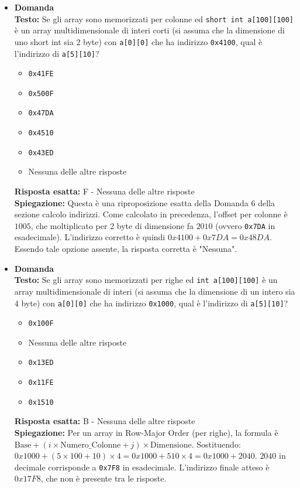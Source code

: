 \documentclass[12pt, a4paper]{article}
\newcounter{domandateoria}
\begin{document}
\begin{itemize}
\newpage

    \item {}\textbf{Domanda \thedomandateoria} \\
    \textbf{Testo:} Se gli array sono memorizzati per colonne ed \texttt{short int a[100][100]} è un array multidimensionale di interi corti (si assuma che la dimensione di uno short int sia 2 byte) con \texttt{a[0][0]} che ha indirizzo \texttt{0x4100}, qual è l'indirizzo di \texttt{a[5][10]}?
    \begin{itemize}
        \item[A)] \texttt{0x41FE}
        \item[B)] \texttt{0x500F}
        \item[C)] \texttt{0x47DA}
        \item[D)] \texttt{0x4510}
        \item[E)] \texttt{0x43ED}
        \item[F)] Nessuna delle altre risposte
    \end{itemize}
    \textbf{Risposta esatta:} F - Nessuna delle altre risposte \\
    \textbf{Spiegazione:} Questa è una riproposizione esatta della Domanda 6 della sezione calcolo indirizzi. Come calcolato in precedenza, l'offset per colonne è $1005$, che moltiplicato per 2 byte di dimensione fa $2010$ (ovvero \texttt{0x7DA} in esadecimale). L'indirizzo corretto è quindi $0x4100 + 0x7DA = 0x48DA$. Essendo tale opzione assente, la risposta corretta è "Nessuna".
    \vspace{0.3cm}

    \item {}\textbf{Domanda \thedomandateoria} \\
    \textbf{Testo:} Se gli array sono memorizzati per righe ed \texttt{int a[100][100]} è un array multidimensionale di interi (si assuma che la dimensione di un intero sia 4 byte) con \texttt{a[0][0]} che ha indirizzo \texttt{0x1000}, qual è l'indirizzo di \texttt{a[5][10]}?
    \begin{itemize}
        \item[A)] \texttt{0x100F}
        \item[B)] Nessuna delle altre risposte
        \item[C)] \texttt{0x13ED}
        \item[D)] \texttt{0x11FE}
        \item[E)] \texttt{0x1510}
    \end{itemize}
    \textbf{Risposta esatta:} B - Nessuna delle altre risposte \\
    \textbf{Spiegazione:} Per un array in Row-Major Order (per righe), la formula è $\text{Base} + (i \times \text{Numero\_Colonne} + j) \times \text{Dimensione}$.
    Sostituendo: $0x1000 + (5 \times 100 + 10) \times 4 = 0x1000 + 510 \times 4 = 0x1000 + 2040$.
    $2040$ in decimale corrisponde a \texttt{0x7F8} in esadecimale. L'indirizzo finale atteso è $0x17F8$, che non è presente tra le risposte.
    \vspace{0.3cm}


\end{itemize}
\end{document}
